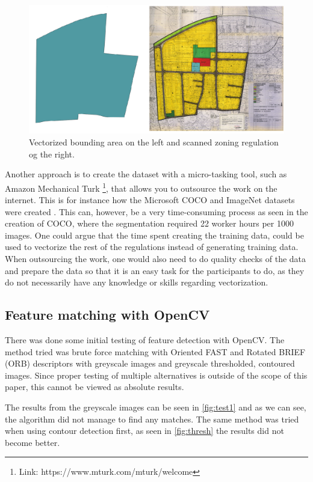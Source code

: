 \begin{figure}[H]
    \centering
    \includegraphics[width=\linewidth]{fig/georef-problem.png}
    \caption{Vectorized bounding area on the left and scanned zoning regulation og the right.}
    \label{fig:georeferencing}
\end{figure}

Another approach is to create the dataset with a micro-tasking tool, such as Amazon Mechanical Turk \footnote{Link: https://www.mturk.com/mturk/welcome}, that allows you to outsource the work on the internet. This is for instance how the Microsoft COCO and ImageNet datasets were created \cite{Lin2014}. This can, however, be a very time-consuming process as seen in the creation of COCO, where the segmentation required 22 worker hours per 1000 images. One could argue that the time spent creating the training data, could be used to vectorize the rest of the regulations instead of generating training data. When outsourcing the work, one would also need to do quality checks of the data and prepare the data so that it is an easy task for the participants to do, as they do not necessarily have any knowledge or skills regarding vectorization.

\subsection{Feature matching with OpenCV}
There was done some initial testing of feature detection with OpenCV. The method tried was brute force matching with Oriented FAST and Rotated BRIEF (ORB) descriptors with greyscale images and greyscale thresholded, contoured images. Since proper testing of multiple alternatives is outside of the scope of this paper, this cannot be viewed as absolute results.

The results from the greyscale images can be seen in \autoref{fig:test1} and as we can see, the algorithm did not manage to find any matches. The same method was tried when using contour detection first, as seen in \autoref{fig:thresh} the results did not become better.


